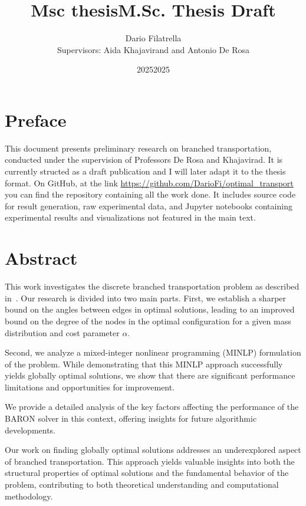 \documentclass[11pt]{article}
\title{Msc thesis}
\date{2025}
\title{M.Sc. Thesis Draft}
\author{Dario Filatrella \\ Supervisors: Aida Khajavirand and Antonio De Rosa}
\date{2025}
\begin{document}
    \maketitle



    \section*{Preface}
    This document presents preliminary research on branched transportation, conducted under the supervision of Professors
    De Rosa and Khajavirad. It is currently structed as a draft publication and I will later adapt it to the thesis format.
    On GitHub, at the link \url{https://github.com/DarioFi/optimal_transport} you can find the repository containing all the work done.
    It includes source code for result generation, raw experimental data, and Jupyter notebooks containing
    experimental results and visualizations not featured in the main text.


    \section*{Abstract}
    This work investigates the discrete
    branched transportation problem as described in~\cite[Bernot, Caselles, Morales]{1}.
    Our research is divided into two main parts.
    First, we establish a sharper bound on the angles between edges in optimal solutions, leading to an improved
    bound on the degree of the nodes in the optimal configuration for a given mass distribution and cost parameter $\alpha$.

    Second, we analyze a mixed-integer nonlinear programming (MINLP) formulation of the problem.
    While demonstrating that this MINLP approach successfully yields globally optimal solutions, we show that there are significant
    performance limitations and opportunities for improvement.

    We provide a detailed analysis of the key factors affecting the performance of the BARON solver in this context,
    offering insights for future algorithmic developments.

    Our work on finding globally optimal solutions addresses an underexplored aspect of branched transportation.
    This approach yields valuable insights into both the structural properties of optimal solutions and
    the fundamental behavior of the problem, contributing to both theoretical understanding and computational methodology.
\end{document}
